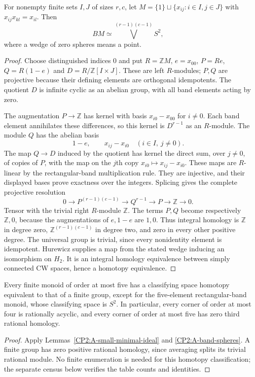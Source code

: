 \begin{lemma}
\label{CP2:A-band-spheres}
For nonempty finite sets $I,J$ of sizes $r,c$, let
$M=\{1\}\sqcup\{x_{ij}:i\in I,j\in J\}$ with
$x_{ij}x_{kl}=x_{il}$. Then
\[
 BM\simeq\bigvee^{(r-1)(c-1)}S^2,
\]
where a wedge of zero spheres means a point.
\end{lemma}
\begin{proof}
Choose distinguished indices $0$ and put $R=\mathbb ZM$, $e=x_{00}$,
$P=Re$, $Q=R(1-e)$ and $D=R/\mathbb Z[I\times J]$. These are left
$R$-modules; $P,Q$ are projective because their defining elements
are orthogonal idempotents. The quotient $D$ is infinite cyclic as
an abelian group, with all band elements acting by zero.

The augmentation $P\to\mathbb Z$ has kernel with basis
$x_{i0}-x_{00}$ for $i\ne0$. Each band element annihilates these
differences, so this kernel is $D^{r-1}$ as an $R$-module.
The module $Q$ has the abelian basis
\[
 1-e,\qquad x_{ij}-x_{i0}\quad(i\in I,\ j\ne0).
\]
The map $Q\to D$ induced by the quotient has kernel the direct sum,
over $j\ne0$, of copies of $P$, with the map on the $j$th copy
$x_{i0}\mapsto x_{ij}-x_{i0}$. These maps are $R$-linear by the
rectangular-band multiplication rule. They are injective, and
their displayed bases prove exactness over the integers. Splicing
gives the complete projective resolution
\[
0\longrightarrow P^{(r-1)(c-1)}\longrightarrow Q^{r-1}
 \longrightarrow P\longrightarrow\mathbb Z\longrightarrow0.
\]
Tensor with the trivial right $R$-module $\mathbb Z$. The terms
$P,Q$ become respectively $\mathbb Z,0$, because the augmentations
of $e,1-e$ are $1,0$. Thus integral homology is $\mathbb Z$ in
degree zero, $\mathbb Z^{(r-1)(c-1)}$ in degree two, and zero
in every other positive degree. The universal group is trivial,
since every nonidentity element is idempotent. Hurewicz supplies a
map from the stated wedge inducing an isomorphism on $H_2$.
It is an integral homology equivalence between simply connected
CW spaces, hence a homotopy equivalence.
\end{proof}

\begin{corollary}
\label{CP2:A-five-types}
Every finite monoid of order at most five has a classifying space
homotopy equivalent to that of a finite group, except for the
five-element rectangular-band monoid, whose classifying space is
$S^2$. In particular, every corner of order at most four is
rationally acyclic, and every corner of order at most five has
zero third rational homology.
\end{corollary}
\begin{proof}
Apply Lemmas~\ref{CP2:A-small-minimal-ideal} and
\ref{CP2:A-band-spheres}. A finite group has zero positive rational
homology, since averaging splits its trivial rational module.
No finite enumeration is needed for this homotopy classification;
the separate census below verifies the table counts and identities.
\end{proof}

